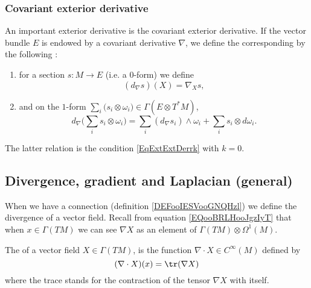 \subsubsection{Covariant exterior derivative}

An important exterior derivative is the covariant exterior derivative. If the vector bundle $E$ is endowed by a covariant derivative $\nabla$, we define the corresponding  by the following :
{
\renewcommand{\theenumi}{\arabic{enumi}.}
\begin{enumerate}
\item for a section $s\colon M\to E$ (i.e. a $0$-form) we define
\begin{equation}
   (d_{\nabla}s)(X)=\nabla_Xs,
\end{equation}
\item and on the $1$-form $\sum_i(s_i\otimes\omega_i \big)\in\Gamma(E\otimes T^*M)$,
\begin{equation}
d_{\nabla}\big( \sum_is_i\otimes\omega_i \big)=\sum_i(d_{\nabla}s_i)\wedge\omega_i+\sum_is_i\otimes d\omega_i.
\end{equation}
\end{enumerate}
}		%
The latter relation is the condition \eqref{EqExtExtDerrk} with $k=0$.

\subsection{Divergence, gradient and Laplacian (general)}

When we have a connection (definition \ref{DEFooIESVooGNQHzl}) we define the divergence of a vector field. Recall from equation \eqref{EQooBRLHooJgzIyT} that when \( x\in\Gamma(TM)\) we can see \( \nabla X\) as an element of \( \Gamma(TM)\otimes \Omega^1(M)\).
\begin{definition}      \label{DEFooTTSFooDdgiKg}
    The  of a vector field $X\in \Gamma(TM)$, is the function $\nabla\cdot X\in C^{\infty}(M)$ defined by
    \begin{equation}
      (\nabla\cdot X)(x)=\tr(\nabla X)
    \end{equation}
    where the trace stands for the contraction of the tensor \( \nabla X\) with itself.
\end{definition}

